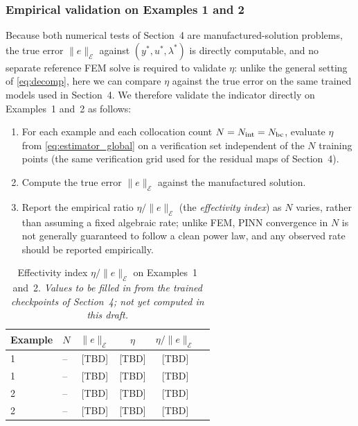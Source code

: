 \subsubsection{Empirical validation on Examples 1 and 2}
\label{sec:empirical-validation}

Because both numerical tests of Section~4 are manufactured-solution problems, the true error $\|e\|_{\mathcal{E}}$ against $(y^*,u^*,\lambda^*)$ is directly computable, and no separate reference FEM solve is required to validate $\eta$: unlike the general setting of \eqref{eq:decomp}, here we can compare $\eta$ against the true error on the same trained models used in Section~4. We therefore validate the indicator directly on Examples~1 and~2 as follows:
\begin{enumerate}
    \item For each example and each collocation count $N=N_{\rm int}=N_{\rm bc}$, evaluate $\eta$ from \eqref{eq:estimator_global} on a verification set independent of the $N$ training points (the same verification grid used for the residual maps of Section~4).
    \item Compute the true error $\|e\|_{\mathcal{E}}$ against the manufactured solution.
    \item Report the empirical ratio $\eta/\|e\|_{\mathcal{E}}$ (the \emph{effectivity index}) as $N$ varies, rather than assuming a fixed algebraic rate; unlike FEM, PINN convergence in $N$ is not generally guaranteed to follow a clean power law, and any observed rate should be reported empirically.
\end{enumerate}

\begin{table}[H]
\centering
\caption{Effectivity index $\eta/\|e\|_{\mathcal{E}}$ on Examples~1 and~2. \textit{Values to be filled in from the trained checkpoints of Section~4; not yet computed in this draft.}}
\label{tab:effectivity}
\begin{tabular}{llcccc}
\toprule
Example & $N$ & $\|e\|_{\mathcal{E}}$ & $\eta$ & $\eta/\|e\|_{\mathcal{E}}$ \\
\midrule
1 & -- & [TBD] & [TBD] & [TBD] \\
1 & -- & [TBD] & [TBD] & [TBD] \\
2 & -- & [TBD] & [TBD] & [TBD] \\
2 & -- & [TBD] & [TBD] & [TBD] \\
\bottomrule
\end{tabular}
\end{table}

